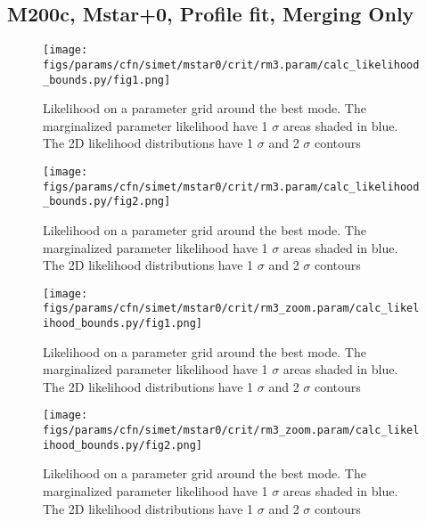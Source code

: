 \documentclass[twocolumn]{article}
\begin{document}
\subsection{M200c, Mstar+0, Profile fit, Merging Only}
\begin{figure}[H]
  \center\texttt{[image: figs/params/cfn/simet/mstar0/crit/rm3.param/calc\_likelihood\_bounds.py/fig1.png]}
  \caption{Likelihood on a parameter grid around the best mode. The marginalized parameter likelihood have
    1 $\sigma$ areas shaded in blue. The 2D likelihood distributions have 1 $\sigma$  and 2 $\sigma$ contours}
  \label{fig:basic_rd:likelihood}
\end{figure}

\begin{figure}[H]
  \center\texttt{[image: figs/params/cfn/simet/mstar0/crit/rm3.param/calc\_likelihood\_bounds.py/fig2.png]}
  \caption{Likelihood on a parameter grid around the best mode. The marginalized parameter likelihood have
    1 $\sigma$ areas shaded in blue. The 2D likelihood distributions have 1 $\sigma$  and 2 $\sigma$ contours}
  \label{fig:basic_rd:likelihood}
\end{figure}

\begin{figure}[H]
  \center\texttt{[image: figs/params/cfn/simet/mstar0/crit/rm3\_zoom.param/calc\_likelihood\_bounds.py/fig1.png]}
  \caption{Likelihood on a parameter grid around the best mode. The marginalized parameter likelihood have
    1 $\sigma$ areas shaded in blue. The 2D likelihood distributions have 1 $\sigma$  and 2 $\sigma$ contours}
  \label{fig:basic_rd:likelihood}
\end{figure}

\begin{figure}[H]
  \center\texttt{[image: figs/params/cfn/simet/mstar0/crit/rm3\_zoom.param/calc\_likelihood\_bounds.py/fig2.png]}
  \caption{Likelihood on a parameter grid around the best mode. The marginalized parameter likelihood have
    1 $\sigma$ areas shaded in blue. The 2D likelihood distributions have 1 $\sigma$  and 2 $\sigma$ contours}
  \label{fig:basic_rd:likelihood}
\end{figure}
\end{document}
